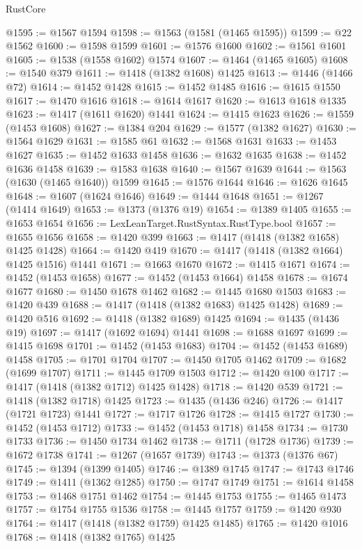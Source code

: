 \begin{lexlean}{RustCore}
\begin{coremodule}
@1595 := @1567 @1594
@1598 := @1563 (@1581 (@1465 @1595))
@1599 := @22 @1562
@1600 := @1598 @1599
@1601 := @1576 @1600
@1602 := @1561 @1601
@1605 := @1538 (@1558 @1602) @1574
@1607 := @1464 (@1465 @1605)
@1608 := @1540 @379
@1611 := @1418 (@1382 @1608) @1425
@1613 := @1446 (@1466 @72)
@1614 := @1452 @1428
@1615 := @1452 @1485
@1616 := @1615 @1550
@1617 := @1470 @1616
@1618 := @1614 @1617
@1620 := @1613 @1618 @1335
@1623 := @1417 (@1611 @1620) @1441
@1624 := @1415 @1623
@1626 := @1559 (@1453 @1608)
@1627 := @1384 @204
@1629 := @1577 (@1382 @1627)
@1630 := @1564 @1629
@1631 := @1585 @61
@1632 := @1568 @1631
@1633 := @1453 @1627
@1635 := @1452 @1633 @1458
@1636 := @1632 @1635
@1638 := @1452 @1636 @1458
@1639 := @1583 @1638
@1640 := @1567 @1639
@1644 := @1563 (@1630 (@1465 @1640)) @1599
@1645 := @1576 @1644
@1646 := @1626 @1645
@1648 := @1607 (@1624 @1646)
@1649 := @1444 @1648
@1651 := @1267 (@1414 @1649)
@1653 := @1373 (@1376 @19)
@1654 := @1389 @1405
@1655 := @1653 @1654
@1656 := LexLeanTarget.RustSyntax.RustType.bool
@1657 := @1655 @1656
@1658 := @1420 @399
@1663 := @1417 (@1418 (@1382 @1658) @1425 @1428)
@1664 := @1420 @419
@1670 := @1417 (@1418 (@1382 @1664) @1425 @1516) @1441
@1671 := @1663 @1670
@1672 := @1415 @1671
@1674 := @1452 (@1453 @1658)
@1677 := @1452 (@1453 @1664) @1458
@1678 := @1674 @1677
@1680 := @1450 @1678 @1462
@1682 := @1445 @1680 @1503
@1683 := @1420 @439
@1688 := @1417 (@1418 (@1382 @1683) @1425 @1428)
@1689 := @1420 @516
@1692 := @1418 (@1382 @1689) @1425
@1694 := @1435 (@1436 @19)
@1697 := @1417 (@1692 @1694) @1441
@1698 := @1688 @1697
@1699 := @1415 @1698
@1701 := @1452 (@1453 @1683)
@1704 := @1452 (@1453 @1689) @1458
@1705 := @1701 @1704
@1707 := @1450 @1705 @1462
@1709 := @1682 (@1699 @1707)
@1711 := @1445 @1709 @1503
@1712 := @1420 @100
@1717 := @1417 (@1418 (@1382 @1712) @1425 @1428)
@1718 := @1420 @539
@1721 := @1418 (@1382 @1718) @1425
@1723 := @1435 (@1436 @246)
@1726 := @1417 (@1721 @1723) @1441
@1727 := @1717 @1726
@1728 := @1415 @1727
@1730 := @1452 (@1453 @1712)
@1733 := @1452 (@1453 @1718) @1458
@1734 := @1730 @1733
@1736 := @1450 @1734 @1462
@1738 := @1711 (@1728 @1736)
@1739 := @1672 @1738
@1741 := @1267 (@1657 @1739)
@1743 := @1373 (@1376 @67)
@1745 := @1394 (@1399 @1405)
@1746 := @1389 @1745
@1747 := @1743 @1746
@1749 := @1411 (@1362 @1285)
@1750 := @1747 @1749
@1751 := @1614 @1458
@1753 := @1468 @1751 @1462
@1754 := @1445 @1753
@1755 := @1465 @1473
@1757 := @1754 @1755 @1536
@1758 := @1445 @1757
@1759 := @1420 @930
@1764 := @1417 (@1418 (@1382 @1759) @1425 @1485)
@1765 := @1420 @1016
@1768 := @1418 (@1382 @1765) @1425

\end{coremodule}
\end{lexlean}
